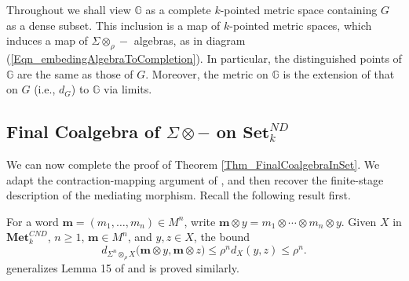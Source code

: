 \documentclass{sn-jnl}%
\theoremstyle{thmstyleone}%
\theoremstyle{thmstyletwo}%
\theoremstyle{thmstylethree}%
\newcommand{\setnd}{\mathbf{Set}_{k}^{ND}}
\newcommand{\mcnd}{\mathbf{Met}_{k}^{CND}}
\newcommand{\M}{\Sigma}
\newcommand{\F}{\M\otimes}
\newcommand{\Fw}{\M\otimes_{\w}}
\newcommand{\Fwi}[1]{\M^{#1}\otimes_{\w}}
\newcommand{\G}{\mathbb{G}}
\newcommand{\w}{\rho}
\begin{document}
Throughout we shall view $\G$ as a complete $k$-pointed metric space containing $G$ as a dense subset. This inclusion is a map of $k$-pointed metric spaces, which induces a map of $\Fw -$ algebras, as in diagram (\ref{Eqn_embedingAlgebraToCompletion}). In particular, the distinguished points of $\G$ are the same as those of $G$. Moreover, the metric on $\G$ is the extension of that on $G$ (i.e., $d_G$) to $\G$ via limits. 


\subsection{Final Coalgebra of $\F-$ on $\setnd$}

We can now complete the proof of Theorem \ref{Thm_FinalCoalgebraInSet}. We adapt the contraction-mapping argument of \cite[proofs of Theorems~4 and~14]{Bhat}, and then recover the finite-stage description of the mediating morphism. Recall the following result first.

For a word $\mathbf m=(m_1,\ldots,m_n)\in M^n$, write $\mathbf m\otimes y=m_1\otimes\cdots\otimes m_n\otimes y$.  Given $X$ in $\mcnd$,  $n\geq1$, $\mathbf m\in M^n$, and $y,z\in X$, the bound 
\begin{equation} 
\label{Eqn_Mi_inequality}
    d_{\Fwi{n}X} \bigl(\mathbf m\otimes y,\mathbf m\otimes z\bigr) \leq \w^n d_X(y,z) \leq \w^n.
\end{equation}
generalizes Lemma 15 of \cite{Bhat} and is proved similarly. 
\end{document}
